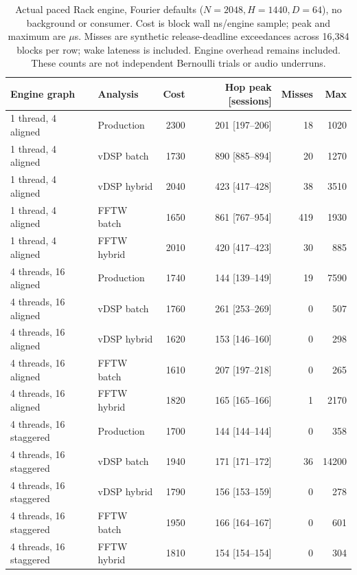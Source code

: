 \begin{table}[htbp]
\centering\small
\begin{tabular}{@{}llrrrr@{}}
\toprule
Engine graph & Analysis & Cost & Hop peak [sessions] & Misses & Max \\
\midrule
1 thread, 4 aligned & Production & 2300 & 201 [197--206] & 18 & 1020 \\
1 thread, 4 aligned & vDSP batch & 1730 & 890 [885--894] & 20 & 1270 \\
1 thread, 4 aligned & vDSP hybrid & 2040 & 423 [417--428] & 38 & 3510 \\
1 thread, 4 aligned & FFTW batch & 1650 & 861 [767--954] & 419 & 1930 \\
1 thread, 4 aligned & FFTW hybrid & 2010 & 420 [417--423] & 30 & 885 \\
4 threads, 16 aligned & Production & 1740 & 144 [139--149] & 19 & 7590 \\
4 threads, 16 aligned & vDSP batch & 1760 & 261 [253--269] & 0 & 507 \\
4 threads, 16 aligned & vDSP hybrid & 1620 & 153 [146--160] & 0 & 298 \\
4 threads, 16 aligned & FFTW batch & 1610 & 207 [197--218] & 0 & 265 \\
4 threads, 16 aligned & FFTW hybrid & 1820 & 165 [165--166] & 1 & 2170 \\
4 threads, 16 staggered & Production & 1700 & 144 [144--144] & 0 & 358 \\
4 threads, 16 staggered & vDSP batch & 1940 & 171 [171--172] & 36 & 14200 \\
4 threads, 16 staggered & vDSP hybrid & 1790 & 156 [153--159] & 0 & 278 \\
4 threads, 16 staggered & FFTW batch & 1950 & 166 [164--167] & 0 & 601 \\
4 threads, 16 staggered & FFTW hybrid & 1810 & 154 [154--154] & 0 & 304 \\
\bottomrule
\end{tabular}
\caption{Actual paced Rack engine, Fourier defaults ($N=2048,H=1440,D=64$), no background or consumer. Cost is block wall ns/engine sample; peak and maximum are $\mu$s. Misses are synthetic release-deadline exceedances across 16,384 blocks per row; wake lateness is included. Engine overhead remains included. These counts are not independent Bernoulli trials or audio underruns.}
\label{tab:study-host}
\end{table}
